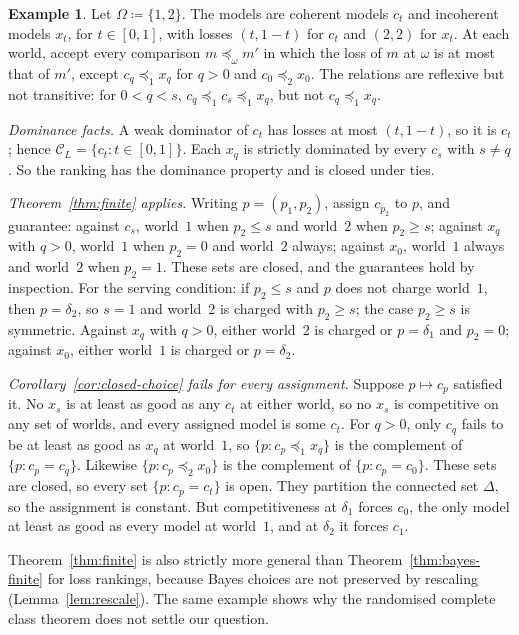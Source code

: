 \documentclass[11pt]{article}
\theoremstyle{definition}
\newtheorem{example}[theorem]{Example}
\theoremstyle{remark}
\newcommand{\C}{\mathcal C}
\begin{document}
\begin{example}\label{ex:two-world}
Let $\Omega\coloneqq\{1,2\}$. The models are coherent models $c_t$ and incoherent models $x_t$, for $t\in[0,1]$, with losses $(t,1-t)$ for $c_t$ and $(2,2)$ for $x_t$. At each world, accept every comparison $m\preceq_\omega m'$ in which the loss of $m$ at $\omega$ is at most that of $m'$, except $c_q\preceq_1x_q$ for $q>0$ and $c_0\preceq_2x_0$. The relations are reflexive but not transitive: for $0<q<s$, $c_q\preceq_1c_s\preceq_1x_q$, but not $c_q\preceq_1x_q$.

\emph{Dominance facts.} A weak dominator of $c_t$ has losses at most $(t,1-t)$, so it is $c_t$; hence $\C_L=\{c_t:t\in[0,1]\}$. Each $x_q$ is strictly dominated by every $c_s$ with $s\ne q$. So the ranking has the dominance property and is closed under ties.

\emph{Theorem~\ref{thm:finite} applies.} Writing $p=(p_1,p_2)$, assign $c_{p_2}$ to $p$, and guarantee: against $c_s$, world~$1$ when $p_2\le s$ and world~$2$ when $p_2\ge s$; against $x_q$ with $q>0$, world~$1$ when $p_2=0$ and world~$2$ always; against $x_0$, world~$1$ always and world~$2$ when $p_2=1$. These sets are closed, and the guarantees hold by inspection. For the serving condition: if $p_2\le s$ and $p$ does not charge world~$1$, then $p=\delta_2$, so $s=1$ and world~$2$ is charged with $p_2\ge s$; the case $p_2\ge s$ is symmetric. Against $x_q$ with $q>0$, either world~$2$ is charged or $p=\delta_1$ and $p_2=0$; against $x_0$, either world~$1$ is charged or $p=\delta_2$.

\emph{Corollary~\ref{cor:closed-choice} fails for every assignment.} Suppose $p\mapsto c_p$ satisfied it. No $x_s$ is at least as good as any $c_t$ at either world, so no $x_s$ is competitive on any set of worlds, and every assigned model is some $c_t$. For $q>0$, only $c_q$ fails to be at least as good as $x_q$ at world~$1$, so $\{p:c_p\preceq_1x_q\}$ is the complement of $\{p:c_p=c_q\}$. Likewise $\{p:c_p\preceq_2x_0\}$ is the complement of $\{p:c_p=c_0\}$. These sets are closed, so every set $\{p:c_p=c_t\}$ is open. They partition the connected set $\Delta$, so the assignment is constant. But competitiveness at $\delta_1$ forces $c_0$, the only model at least as good as every model at world~$1$, and at $\delta_2$ it forces $c_1$.
\end{example}

Theorem~\ref{thm:finite} is also strictly more general than Theorem~\ref{thm:bayes-finite} for loss rankings, because Bayes choices are not preserved by rescaling (Lemma~\ref{lem:rescale}). The same example shows why the randomised complete class theorem does not settle our question.
\end{document}
